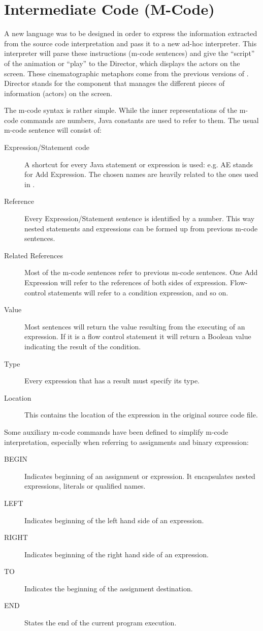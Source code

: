 \section{Intermediate Code (M-Code)}
\label{sec:Intermediate_Code}

A new language was to be designed in order to express the information extracted from the
source code interpretation and pass it to a new ad-hoc interpreter.
This interpreter will parse these instructions (m-code sentences)
and give the ``script'' of the animation or ``play'' to the Director,
which displays the actors on the screen. These cinematographic metaphors
come from the previous versions of \jel{}. Director stands for the
component that manages the different pieces of information (actors)
on the screen.

The m-code syntax is rather simple. While the inner representations
of the m-code commands are numbers, Java constants are used to
refer to them. The usual m-code sentence will consist of:

\begin{description}
\item[Expression/Statement code] A shortcut for every Java statement
or expression is used: e.g. AE stands for Add Expression. The
chosen names are heavily related to the ones used in \djava{}.
\item[Reference] Every Expression/Statement sentence
is identified by a number. This way nested statements and expressions
can be formed up from previous m-code sentences.
\item[Related References] Most of the m-code sentences refer
to previous m-code sentences. One Add Expression will refer to
the references of both sides of expression. Flow-control statements
will refer to a condition expression, and so on.
\item[Value] Most sentences will return the value resulting from
the executing of an expression. If it is a flow control statement
it will return a Boolean value indicating the result of the condition.
\item[Type] Every expression that has a result must specify
its type.
\item[Location] This contains the location of the expression
in the original source code file.
\end{description}

Some auxiliary m-code commands have been defined to simplify m-code
interpretation, especially when referring to assignments and binary expression:
\begin{description}
\item[BEGIN] Indicates beginning of an assignment or expression.
It encapsulates nested expressions, literals or qualified names.
\item[LEFT] Indicates beginning of the left hand side of an expression.
\item[RIGHT] Indicates beginning of the right hand side of an expression.
\item[TO] Indicates the beginning of the assignment destination.
\item[END]  States the end of the current program execution.
\end{description}

